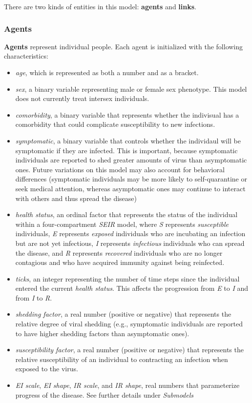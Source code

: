 \documentclass[
]{article}
\providecommand{\tightlist}{%
  \setlength{\itemsep}{0pt}\setlength{\parskip}{0pt}}
\begin{document}
There are two kinds of entities in this model: \textbf{agents} and
\textbf{links}.

\hypertarget{agents}{%
\subsubsection{Agents}\label{agents}}

\textbf{Agents} represent individual people. Each agent is initialized
with the following characteristics:

\begin{itemize}
\tightlist
\item
  \emph{age}, which is represented as both a number and as a bracket.
\item
  \emph{sex}, a binary variable representing male or female sex
  phenotype. This model does not currently treat intersex individuals.
\item
  \emph{comorbidity}, a binary variable that represents whether the
  indivisual has a comorbidity that could complicate susceptibility to
  new infections.
\item
  \emph{symptomatic}, a binary variable that controls whether the
  individaul will be symptomatic if they are infected. This is
  important, because symptomatic individuals are reported to shed
  greater amounts of virus than asymptomatic ones. Future variations on
  this model may also account for behavioral differences (symptomatic
  individuals may be more likely to self-quarantine or seek medical
  attention, whereas asymptomatic ones may continue to interact with
  others and thus spread the disease)
\item
  \emph{health status}, an ordinal factor that represents the status of
  the individual within a four-compartment \emph{SEIR} model, where
  \emph{S} represents \emph{susceptible} individuals, \emph{E}
  represents \emph{exposed} individuals who are incubating an infection
  but are not yet infectious, \emph{I} represents \emph{infectious}
  individuals who can spread the disease, and \emph{R} represents
  \emph{recovered} individuals who are no longer contagious and who have
  acquired immunity against being reinfected.
\item
  \emph{ticks}, an integer representing the number of time steps since
  the individual entered the current \emph{health status}. This affects
  the progression from \emph{E} to \emph{I} and from \emph{I} to
  \emph{R}.
\item
  \emph{shedding factor}, a real number (positive or negative) that
  represents the relative degree of viral shedding (e.g., symptomatic
  individuals are reported to have higher shedding factors than
  asymptomatic ones).
\item
  \emph{susceptibility factor}, a real number (positive or negative)
  that represents the relative susceptibility of an individual to
  contracting an infection when exposed to the virus.
\item
  \emph{EI scale}, \emph{EI shape}, \emph{IR scale}, and \emph{IR
  shape}, real numbers that parameterize progress of the disease. See
  further details under \emph{Submodels}
\end{itemize}
\end{document}
